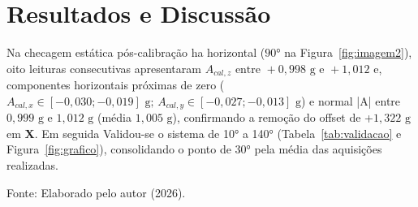 \section{Resultados e Discussão}

Na checagem estática pós-calibração ha horizontal ($90°$ na Figura~\ref{fig:imagem2}), oito leituras consecutivas apresentaram $A_{cal,z} \text{ entre } +0,998 \text{ g e } +1,012 \text{ e}$, componentes horizontais próximas de zero ($A_{cal,x} \in [-0,030; -0,019] \text{ g; } A_{cal,y} \in [-0,027; -0,013] \text{ g}$) e normal |A| entre $0,999 \text{ g}$ e $1,012 \text{ g}$ (média $1,005 \text{ g}$), confirmando a remoção do offset de +$1,322 \text{ g}$ em \textbf{X}. Em seguida Validou-se o sistema de 10° a 140° (Tabela~\ref{tab:validacao} e Figura~\ref{fig:grafico}{}), consolidando o ponto de 30° pela média das aquisições realizadas. 


\begin{table}[htbp]
    \centering
    \caption{Validação Angular com Transferidor (N = 100 Leituras por Ponto)}
    \label{tab:validacao}
    
    
    \vspace{0.2cm}
    
    \raggedright
    \footnotesize
    Fonte: Elaborado pelo autor (2026).
\end{table}

